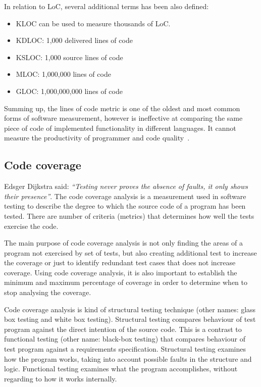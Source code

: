 In relation to \ac{LoC}, several additional terms has been also defined: 
\begin{itemize}
\item KLOC can be used to measure thousands of \ac{LoC}.
\item KDLOC: 1,000 delivered lines of code
\item KSLOC: 1,000 source lines of code
\item MLOC: 1,000,000 lines of code
\item GLOC: 1,000,000,000 lines of code
\end{itemize}

Summing up, the lines of code metric is one of the oldest and most common forms of software measurement, however is ineffective at comparing the same piece of code of implemented functionality in different languages. It cannot measure the productivity of programmer and code quality~\cite{metrics}.

\subsection{Code coverage}
\label{sec:codecoverage}

Edsger Dijkstra said: \textit{``Testing never proves the absence of faults, it only shows their presence''}.
The code coverage analysis is a measurement used in software testing to describe the degree to which the source code of a program has been tested. There are number of criteria (metrics) that determines how well the tests exercise the code.

The main purpose of code coverage analysis is not only finding the areas of a program not exercised by set of tests, but also creating additional test to increase the coverage or just to identify redundant test cases that does not increase coverage. Using code coverage analysis, it is also important to establish the minimum and maximum percentage of coverage in order to determine when to stop analysing the coverage. 

Code coverage analysis is kind of structural testing technique (other names: glass box testing and white box testing). Structural testing compares behaviour of test program against the direct  intention of the source code. This is a contrast to functional testing (other name: black-box testing) that compares behaviour of test program against a requirements specification. Structural testing examines how the program works, taking into account possible faults in the structure and logic. Functional testing examines what the program accomplishes, without regarding to how it works internally.

